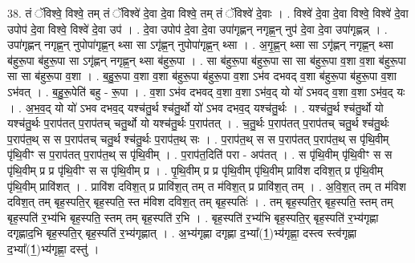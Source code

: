 \documentclass[17pt]{extarticle}
\begin{document}
38. तं ॅविश्वे॒ विश्वे॒ तम् तं ॅविश्वे॑ दे॒वा दे॒वा विश्वे॒ तम् तं ॅविश्वे॑ दे॒वाः । . विश्वे॑ दे॒वा दे॒वा विश्वे॒ विश्वे॑ दे॒वा उपोप॑ दे॒वा विश्वे॒ विश्वे॑ दे॒वा उप॑ । . दे॒वा उपोप॑ दे॒वा दे॒वा उपा॑गृह्णन् नगृह्ण॒न् नुप॑ दे॒वा दे॒वा उपा॑गृह्णन्न् । . उपा॑गृह्णन् नगृह्ण॒न् नुपोपा॑गृह्ण॒न् थ्सा सा ऽगृ॑ह्ण॒न् नुपोपा॑गृह्ण॒न् थ्सा । . अ॒गृ॒ह्ण॒न् थ्सा सा ऽगृ॑ह्णन् नगृह्ण॒न् थ्सा ब॑हुरू॒पा ब॑हुरू॒पा सा ऽगृ॑ह्णन् नगृह्ण॒न् थ्सा ब॑हुरू॒पा । . सा ब॑हुरू॒पा ब॑हुरू॒पा सा सा ब॑हुरू॒पा व॒शा व॒शा ब॑हुरू॒पा सा सा ब॑हुरू॒पा व॒शा । . ब॒हु॒रू॒पा व॒शा व॒शा ब॑हुरू॒पा ब॑हुरू॒पा व॒शा ऽभ॑व दभवद् व॒शा ब॑हुरू॒पा ब॑हुरू॒पा व॒शा ऽभ॑वत् । . ब॒हु॒रू॒पेति॑ बहु - रू॒पा । . व॒शा ऽभ॑व दभवद् व॒शा व॒शा ऽभ॑व॒द् यो यो॑ ऽभवद् व॒शा व॒शा ऽभ॑व॒द् यः । . अ॒भ॒व॒द् यो यो॑ ऽभव दभव॒द् यश्च॑तु॒र्थ श्च॑तु॒र्थो यो॑ ऽभव दभव॒द् यश्च॑तु॒र्थः । . यश्च॑तु॒र्थ श्च॑तु॒र्थो यो यश्च॑तु॒र्थः प॒राप॑तत् प॒राप॑तच् चतु॒र्थो यो यश्च॑तु॒र्थः प॒राप॑तत् । . च॒तु॒र्थः प॒राप॑तत् प॒राप॑तच् चतु॒र्थ श्च॑तु॒र्थः प॒राप॑त॒थ् स स प॒राप॑तच् चतु॒र्थ श्च॑तु॒र्थः प॒राप॑त॒थ् सः । . प॒राप॑त॒थ् स स प॒राप॑तत् प॒राप॑त॒थ् स पृ॑थि॒वीम् पृ॑थि॒वीꣳ स प॒राप॑तत् प॒राप॑त॒थ् स पृ॑थि॒वीम् । . प॒राप॑त॒दिति॑ परा - अप॑तत् । . स पृ॑थि॒वीम् पृ॑थि॒वीꣳ स स पृ॑थि॒वीम् प्र प्र पृ॑थि॒वीꣳ स स पृ॑थि॒वीम् प्र । . पृ॒थि॒वीम् प्र प्र पृ॑थि॒वीम् पृ॑थि॒वीम् प्रावि॑श दविश॒त् प्र पृ॑थि॒वीम् पृ॑थि॒वीम् प्रावि॑शत् । . प्रावि॑श दविश॒त् प्र प्रावि॑श॒त् तम् त म॑विश॒त् प्र प्रावि॑श॒त् तम् । . अ॒वि॒श॒त् तम् त म॑विश दविश॒त् तम् बृह॒स्पति॒र् बृह॒स्पति॒ स्त म॑विश दविश॒त् तम् बृह॒स्पतिः॑ । . तम् बृह॒स्पति॒र् बृह॒स्पति॒ स्तम् तम् बृह॒स्पति॑ र॒भ्य॑भि बृह॒स्पति॒ स्तम् तम् बृह॒स्पति॑ र॒भि । . बृह॒स्पति॑ र॒भ्य॑भि बृह॒स्पति॒र् बृह॒स्पति॑ र॒भ्य॑गृह्णा दगृह्णाद॒भि बृह॒स्पति॒र् बृह॒स्पति॑ र॒भ्य॑गृह्णात् । . अ॒भ्य॑गृह्णा दगृह्णा द॒भ्या᳚(1॒)भ्य॑गृह्णा॒ दस्त्व स्त्व॑गृह्णा द॒भ्या᳚(1॒)भ्य॑गृह्णा॒ दस्तु॑ । \newline
\pagebreak
{}
\end{document}
